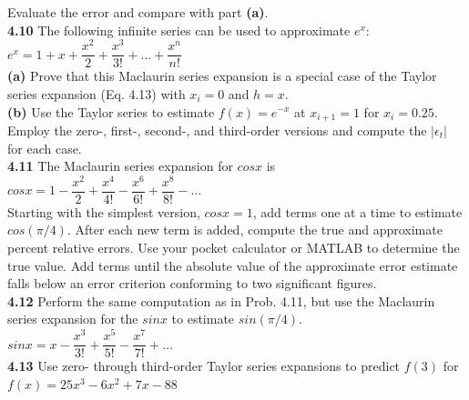 \documentclass[../main.tex]{subfiles}
\begin{document}
\begin{multicols}{2}
    \noindent Evaluate the error and compare with part \textbf{(a)}.\\

    \noindent\textbf{4.10} The following infinite series can be used to approximate
    $e^x$:\\
    
    $e^x = 1+x+\dfrac{x^2}{2}+\dfrac{x^3}{3!}+\hdots +\dfrac{x^n}{n!}$\\

    \noindent\textbf{(a)} Prove that this Maclaurin series expansion is a special
    case of the Taylor series expansion (Eq. 4.13) with $x_i=0$ and $h = x$.\\

    \noindent\textbf{(b)} Use the Taylor series to estimate $f(x) = e^{-x}$ at $x_{i+1}= 1$
    for $x_i = 0.25$. Employ the zero-, first-, second-, 
    and third-order versions and compute the $\left\lvert \epsilon_t \right\rvert$  for each case.\\

    \noindent\textbf{4.11} The Maclaurin series expansion for $cos x$ is\\

    $cosx = 1-\dfrac{x^2}{2}+\dfrac{x^4}{4!}-\dfrac{x^6}{6!}+\dfrac{x^8}{8!}-\hdots$\\

    \noindent Starting with the simplest version, $cos x = 1$, add terms one
    at a time to estimate $cos(\pi/4)$. After each new term is added,
    compute the true and approximate percent relative errors.
    Use your pocket calculator or MATLAB to determine the
    true value. Add terms until the absolute value of the approximate
    error estimate falls below an error criterion conforming
    to two significant figures.\\

    \noindent\textbf{4.12} Perform the same computation as in Prob. 4.11, but
    use the Maclaurin series expansion for the $sin x$ to estimate
    $sin(\pi/4)$.\\

    $sinx = x-\dfrac{x^3}{3!}+\dfrac{x^5}{5!}-\dfrac{x^7}{7!}+\hdots$\\

    \noindent\textbf{4.13} Use zero- through third-order Taylor series expansions
    to predict $f (3)$ for\\

    $f(x) = 25x^3-6x^2+7x-88$\\


\end{multicols}
\end{document}
